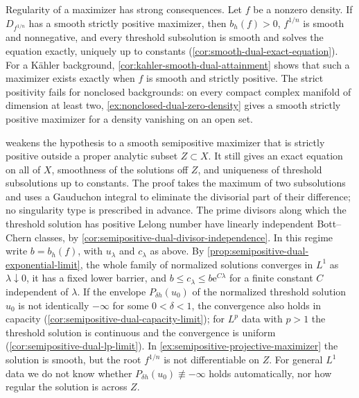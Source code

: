 Regularity of a maximizer has strong consequences. Let $f$ be a nonzero density. If $D_{f^{1/n}}$ has a smooth strictly positive maximizer, then $b_h(f)>0$, $f^{1/n}$ is smooth and nonnegative, and every threshold subsolution is smooth and solves the equation exactly, uniquely up to constants (\cref{cor:smooth-dual-exact-equation}). For a K\"ahler background, \cref{cor:kahler-smooth-dual-attainment} shows that such a maximizer exists exactly when $f$ is smooth and strictly positive. The strict positivity fails for nonclosed backgrounds: on every compact complex manifold of dimension at least two, \cref{ex:nonclosed-dual-zero-density} gives a smooth strictly positive maximizer for a density vanishing on an open set.

 weakens the hypothesis to a smooth semipositive maximizer that is strictly positive outside a proper analytic subset $Z\subset X$. It still gives an exact equation on all of $X$, smoothness of the solutions off $Z$, and uniqueness of threshold subsolutions up to constants. The proof takes the maximum of two subsolutions and uses a Gauduchon integral to eliminate the divisorial part of their difference; no singularity type is prescribed in advance. The prime divisors along which the threshold solution has positive Lelong number have linearly independent Bott--Chern classes, by \cref{cor:semipositive-dual-divisor-independence}. In this regime write $b=b_h(f)$, with $u_\lambda$ and $c_\lambda$ as above. By \cref{prop:semipositive-dual-exponential-limit}, the whole family of normalized solutions converges in $L^1$ as $\lambda\downarrow0$, it has a fixed lower barrier, and $b\leq c_\lambda\leq b\mathrm{e}^{C\lambda}$ for a finite constant $C$ independent of $\lambda$. If the envelope $P_{\delta h}(u_0)$ of the normalized threshold solution $u_0$ is not identically $-\infty$ for some $0<\delta<1$, the convergence also holds in capacity (\cref{cor:semipositive-dual-capacity-limit}); for $L^p$ data with $p>1$ the threshold solution is continuous and the convergence is uniform (\cref{cor:semipositive-dual-lp-limit}). In \cref{ex:semipositive-projective-maximizer} the solution is smooth, but the root $f^{1/n}$ is not differentiable on $Z$. For general $L^1$ data we do not know whether $P_{\delta h}(u_0)\not\equiv-\infty$ holds automatically, nor how regular the solution is across $Z$.

